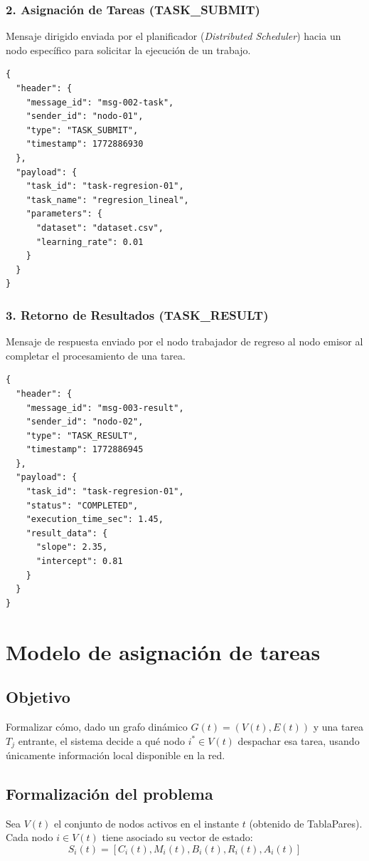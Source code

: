 \documentclass{article}
\begin{document}
\subsubsection{2. Asignación de Tareas (TASK\_SUBMIT)}
Mensaje dirigido enviada por el planificador (\textit{Distributed Scheduler}) hacia un nodo específico para solicitar la ejecución de un trabajo.

\begin{lstlisting}[caption={Mensaje JSON para envío de tareas}]
{
  "header": {
    "message_id": "msg-002-task",
    "sender_id": "nodo-01",
    "type": "TASK_SUBMIT",
    "timestamp": 1772886930
  },
  "payload": {
    "task_id": "task-regresion-01",
    "task_name": "regresion_lineal",
    "parameters": {
      "dataset": "dataset.csv",
      "learning_rate": 0.01
    }
  }
}
\end{lstlisting}

\subsubsection{3. Retorno de Resultados (TASK\_RESULT)}
Mensaje de respuesta enviado por el nodo trabajador de regreso al nodo emisor al completar el procesamiento de una tarea.

\begin{lstlisting}[caption={Mensaje JSON para entrega de resultados}]
{
  "header": {
    "message_id": "msg-003-result",
    "sender_id": "nodo-02",
    "type": "TASK_RESULT",
    "timestamp": 1772886945
  },
  "payload": {
    "task_id": "task-regresion-01",
    "status": "COMPLETED",
    "execution_time_sec": 1.45,
    "result_data": {
      "slope": 2.35,
      "intercept": 0.81
    }
  }
}
\end{lstlisting}

\section{Modelo de asignación de tareas}

\subsection{Objetivo}
Formalizar cómo, dado un grafo dinámico $G(t) = (V(t), E(t))$ y una tarea $T_j$ entrante, el sistema decide a qué nodo $i^* \in V(t)$ despachar esa tarea, usando únicamente información local disponible en la red.

\subsection{Formalización del problema}
Sea $V(t)$ el conjunto de nodos activos en el instante $t$ (obtenido de TablaPares). Cada nodo $i \in V(t)$ tiene asociado su vector de estado:
\begin{equation}
S_i(t) = [C_i(t), M_i(t), B_i(t), R_i(t), A_i(t)]
\end{equation}
\end{document}
